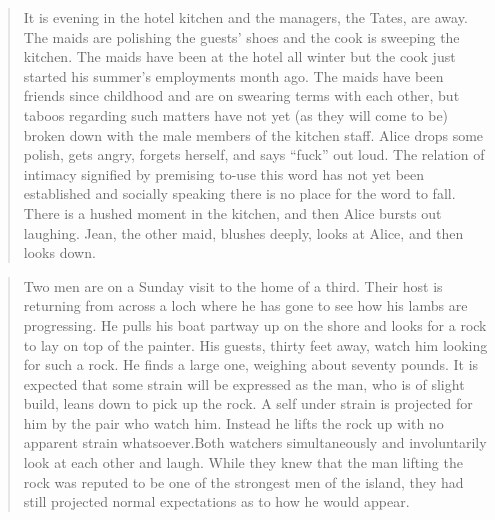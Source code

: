 \documentclass[openany,nobib]{tufte-book}
\begin{document}
\begin{quote}
It is evening in the hotel kitchen and the managers, the Tates, are
away. The maids are polishing the guests' shoes and the cook is sweeping
the kitchen. The maids have been at the hotel all winter but the cook
just started his summer's employments month ago. The maids have been
friends since childhood and are on swearing terms with each other, but
taboos regarding such matters have not yet (as they will come to be)
broken down with the male members of the kitchen staff. Alice drops some
polish, gets angry, forgets herself, and says ``fuck'' out loud. The
relation of intimacy signified by premising to-use this word has not yet
been established and socially speaking there is no place for the word to
fall. There is a hushed moment in the kitchen, and then Alice bursts out
laughing. Jean, the other maid, blushes deeply, looks at Alice, and then
looks down.
\end{quote}
\newpage
\begin{quote}
Two men are on a Sunday visit to the home of a third. Their host is
returning from across a loch where he has gone to see how his lambs are
progressing. He pulls his boat partway up on the shore and looks for a
rock to lay on top of the painter. His guests, thirty feet away, watch
him looking for such a rock. He finds a large one, weighing about
seventy pounds. It is expected that some strain will be expressed as the
man, who is of slight build, leans down to pick up the rock. A self
under strain is projected for him by the pair who watch him. Instead he
lifts the rock up with no apparent strain whatsoever.Both watchers
simultaneously and involuntarily look at each other and laugh. While
they knew that the man lifting the rock was reputed to be one of the
strongest men of the island, they had still projected normal
expectations as to how he would appear.
\end{quote}
\end{document}

